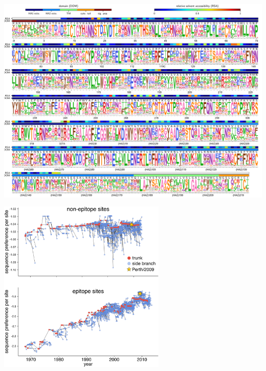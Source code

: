 \documentclass[9pt,twocolumn,twoside]{pnas-new}
\newcommand{\comment}[1]{{\color{red}[\textsl{#1}]}}
\begin{document}
\begin{suppfigure}
\centerline{\includegraphics[width=\textwidth]{figs/S03_WSNprefs_logoplot/WSN-rescaled_prefs.pdf}}
\caption{\label{suppfig:WSNprefs_logoplot}
{\bf The site-specific amino-acid preferences of the WSN/1933 H1 HA.} 
The amino-acid preferences from~\cite{doud2016accurate} after taking the average of the experimental replicates and re-scaling~\cite{hilton2017phydms} by the stringency parameter.
The sites are in H3 numbering.
\comment{The top overlay bar indicates the relative solvent accessibility (RSA).}.
The bottom overlay bar indicates the HA domain (sig. pep. = signal peptide, HA1 ecto. = HA1 ectodomain, HA2 ecto. = HA2 ectodomain, TM = transmembrane domain, cyto. tail. = cytoplasmic tail).
The letters directly above each logo stack indicate the wildtype amino acid at that site.
}
\end{suppfigure}

\begin{suppfigure}
\centerline{\includegraphics[width=0.6\textwidth]{figs/S04_seqpref_zoomed/seqpref_zoomed.pdf}}
\caption{\label{suppfig:seqpref_zoomed}
{\bf The per-site sequence preference at epitope and non-epitope sites}
The per-site sequence preferences shown in Figure~\ref{fig:sequence_preference}B, but on their own y-axes.
}
\end{suppfigure}
\end{document}
